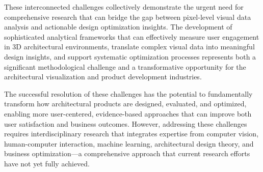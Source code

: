 \documentclass[12pt,a4paper]{book}
\begin{document}
These interconnected challenges collectively demonstrate the urgent need for comprehensive research that can bridge the gap between pixel-level visual data analysis and actionable design optimization insights. The development of sophisticated analytical frameworks that can effectively measure user engagement in 3D architectural environments, translate complex visual data into meaningful design insights, and support systematic optimization processes represents both a significant methodological challenge and a transformative opportunity for the architectural visualization and product development industries.

The successful resolution of these challenges has the potential to fundamentally transform how architectural products are designed, evaluated, and optimized, enabling more user-centered, evidence-based approaches that can improve both user satisfaction and business outcomes. However, addressing these challenges requires interdisciplinary research that integrates expertise from computer vision, human-computer interaction, machine learning, architectural design theory, and business optimization---a comprehensive approach that current research efforts have not yet fully achieved.
\end{document}
